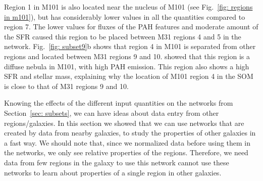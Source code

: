     Region 1 in M101 is also located near the nucleus of M101 (see Fig.~\ref{fig: regions in m101}), but has considerably lower values in all the quantities compared to region 7.
    The lower values for fluxes of the PAH features and moderate amount of the SFR caused this region to be placed between M31 regions 4 and 5 in the network. 
    Fig.~\ref{fig: subset9}b shows that region 4 in M101 is separated from other regions and located between M31 regions 9 and 10.
    \cite{Gordon08} showed that this region is a diffuse nebula in M101, with high PAH emission. 
    This region also shows a high SFR and stellar mass, explaining why the location of M101 region 4 in the SOM is close to that of M31 regions 9 and 10.
    
    Knowing the effects of the different input quantities on the networks from Section~\ref{sec: subsets}, we can have ideas about data entry from other regions/galaxies.
    In this section we showed that we can use networks that are created by data from nearby galaxies, to study the properties of other galaxies in a fast way.
    We should note that, since we normalized data before using them in the networks, we only see relative properties of the regions.
    Therefore, we need data from few regions in the galaxy to use this network cannot use these networks to learn about properties of a single region in other galaxies.
    
    

